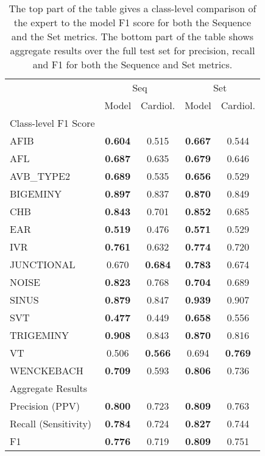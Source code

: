 \documentclass{article}
\begin{document}
\begin{table}    
\centering
\begin{footnotesize}
\begin{tabular}{l c c c c}
\toprule
 & \multicolumn{2}{c}{Seq} & \multicolumn{2}{c}{Set} \\
\cmidrule{2-5}
 & Model & Cardiol. & Model & Cardiol. \\
\midrule
Class-level F1 Score & & & & \\
\midrule
 AFIB & \textbf{0.604} & 0.515 & \textbf{0.667} & 0.544 \\
 AFL & \textbf{0.687} & 0.635 & \textbf{0.679} & 0.646 \\
 AVB\_TYPE2 & \textbf{0.689} & 0.535 & \textbf{0.656} & 0.529 \\
 BIGEMINY & \textbf{0.897} & 0.837 & \textbf{0.870} & 0.849 \\
 CHB & \textbf{0.843} & 0.701 & \textbf{0.852} & 0.685 \\
 EAR & \textbf{0.519} & 0.476 & \textbf{0.571} & 0.529 \\
 IVR & \textbf{0.761} & 0.632 & \textbf{0.774} & 0.720 \\
 JUNCTIONAL & 0.670 & \textbf{0.684} & \textbf{0.783} & 0.674 \\
 NOISE & \textbf{0.823} & 0.768 & \textbf{0.704} & 0.689 \\
 SINUS & \textbf{0.879} & 0.847 & \textbf{0.939} & 0.907 \\
 SVT & \textbf{0.477} & 0.449 & \textbf{0.658} & 0.556 \\
 TRIGEMINY & \textbf{0.908} & 0.843 & \textbf{0.870} & 0.816 \\
 VT & 0.506 & \textbf{0.566} & 0.694 & \textbf{0.769} \\
 WENCKEBACH & \textbf{0.709} & 0.593 & \textbf{0.806} & 0.736 \\
\midrule\midrule
 Aggregate Results & & & & \\
\midrule
 Precision (PPV) & \textbf{0.800} & 0.723 & \textbf{0.809} & 0.763 \\
 Recall (Sensitivity) & \textbf{0.784} & 0.724 & \textbf{0.827} & 0.744 \\
 F1 & \textbf{0.776} & 0.719 & \textbf{0.809} & 0.751 \\
\bottomrule
\end{tabular}
\end{footnotesize}
\caption{The top part of the table gives a class-level comparison of the expert to the model F1 score for both the Sequence and the Set metrics. The bottom part of the table shows aggregate results over the full test set for precision, recall and F1 for both the Sequence and Set metrics.}
\label{tab:HumanVsModel}
\end{table}
\end{document}
